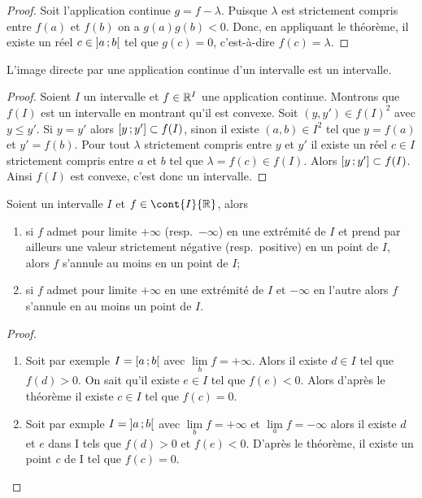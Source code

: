 \begin{proof}
  Soit l'application continue $g=f-\lambda$. Puisque $\lambda$ est strictement compris entre $f(a)$ et $f(b)$ on a $g(a)g(b) < 0$. Donc, en appliquant le théorème, il existe un réel $c \in \left] a \, ;  b \right[$ tel que $g(c)=0$, c'est-à-dire $f(c)=\lambda$.
\end{proof}
\begin{cor}
  L'image directe par une application continue d'un intervalle est un intervalle.
\end{cor}
\begin{proof}
  Soient $I$ un intervalle et $f \in \mathbb{R}^I$ une application continue. Montrons que $f(I)$ est un intervalle en montrant qu'il est convexe. Soit $(y,y') \in f(I)^2$ avec $y \leq y'$. Si $y=y'$ alors $\left[ y \, ;  y' \right] \subset f(I)$, sinon il existe $(a,b) \in I^2$ tel que $y=f(a)$ et $y'=f(b)$. Pour tout $\lambda$ strictement compris entre $y$ et $y'$ il existe un réel $c \in I$ strictement compris entre $a$ et $b$ tel que $\lambda=f(c) \in f(I)$. Alors $\left[ y \, ;  y' \right] \subset f(I)$. Ainsi $f(I)$ est convexe, c'est donc un intervalle.
\end{proof}
\begin{cor}
  Soient un intervalle $I$ et $f \in \cont{I}{\R}$, alors
  \begin{enumerate}
  \item si $f$ admet pour limite $+\infty$ (resp.\ $-\infty$) en une extrémité de $I$ et prend par ailleurs une valeur strictement négative (resp.\ positive) en un point de $I$, alors $f$ s'annule au moins en un point de $I$;
  \item si $f$ admet pour limite $+\infty$ en une extrémité de $I$ et $-\infty$ en l'autre alors $f$ s'annule en au moins un point de $I$.
  \end{enumerate}
\end{cor}
\begin{proof}
  \begin{enumerate}
  \item Soit par exemple $I=\left[ a \, ;  b \right[$ avec $\lim\limits_{b} f =+\infty$. Alors il existe $d \in I$ tel que $f(d)>0$. On sait qu'il existe $e \in I$ tel que $f(e) < 0$. Alors d'après le théorème il existe $c \in I$ tel que $f(c)=0$.
  \item Soit par exmple $I=\left] a \, ;  b \right[$ avec $\lim\limits_{b} f =+\infty$ et $\lim\limits_{a} f =-\infty$ alors il existe $d$ et $e$ dans I tels que $f(d)>0$ et $f(e) <0$. D'après le théorème, il existe un point $c$ de I tel que $f(c)=0$.
  \end{enumerate}
\end{proof}


